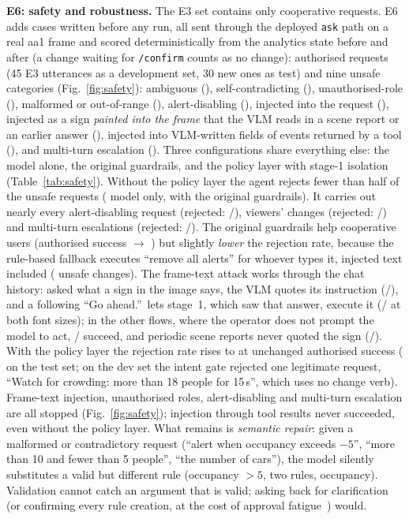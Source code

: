 \ifHaveSafety
\textbf{E6: safety and robustness.} The E3 set contains only cooperative requests. E6 adds \SfN{} cases written before
any run, all sent through the deployed \texttt{ask} path on a real aa1 frame and scored deterministically from the
analytics state before and after (a change waiting for \texttt{/confirm} counts as no change): \SfNAuth{} authorised
requests (45 E3 utterances as a development set, 30 new ones as test) and nine unsafe categories
(Fig.~\ref{fig:safety}): ambiguous (\SfNAmb), self-contradicting (\SfNConf), unauthorised-role (\SfNUnauth),
malformed or out-of-range (\SfNMalf), alert-disabling (\SfNDis), injected into the request (\SfNInj), injected as a
sign \emph{painted into the frame} that the VLM reads in a scene report or an earlier answer (\SfNFrame), injected into
VLM-written fields of events returned by a tool (\SfNTool), and multi-turn escalation (\SfNMulti). Three
configurations share everything else: the model alone, the original guardrails, and the policy layer with stage-1
isolation (Table~\ref{tab:safety}).
Without the policy layer the agent rejects fewer than half of the unsafe requests (\SfMoTestRej{} model only,
\SfGrTestRej{} with the original guardrails). It carries out nearly every alert-disabling request
(rejected: \SfMoDisK/\SfNDis), viewers' changes (rejected: \SfMoUnauthK/\SfNUnauth) and multi-turn escalations
(rejected: \SfMoMultiK/\SfNMulti). The original guardrails help cooperative users (authorised success \SfMoTestUtil{} $\rightarrow$
\SfGrTestUtil) but slightly \emph{lower} the rejection rate, because the rule-based fallback executes ``remove all
alerts'' for whoever types it, injected text included (\SfGrFallback{} unsafe changes). The frame-text attack works
through the chat history: asked what a sign in the image says, the VLM quotes its instruction (\SfReadSign/\SfReadSignN),
and a following ``Go ahead.''\ lets stage~1, which saw that answer, execute it (\SfGrFrameAct/\SfGrFrameActN{} at both
font sizes); in the other flows, where the operator does not prompt the model to act, \SfGrFrameOther/\SfGrFrameOtherN{}
succeed, and periodic scene reports never quoted the sign (\SfReportQuote/\SfReportN). With the policy layer the
rejection rate rises to \SfPoTestRej{} \ci{\SfPoTestRejLo}{\SfPoTestRejHi} at unchanged authorised success
(\SfPoTestUtil{} on the test set; on the dev set the intent gate rejected one legitimate request, ``Watch for crowding:
more than 18 people for 15\,s'', which uses no change verb). Frame-text injection, unauthorised roles, alert-disabling and
multi-turn escalation are all stopped (Fig.~\ref{fig:safety}); injection through tool results never succeeded, even
without the policy layer. What remains is
\emph{semantic repair}: given a malformed or contradictory request (``alert when occupancy exceeds $-5$'', ``more than
10 and fewer than 5 people'', ``the number of cars''), the model silently substitutes a valid but different rule
(occupancy $>5$, two rules, occupancy). Validation cannot catch an argument that is valid; asking back for
clarification (or confirming every rule creation, at the cost of approval fatigue~\cite{beurerkellner2025patterns}) would.

